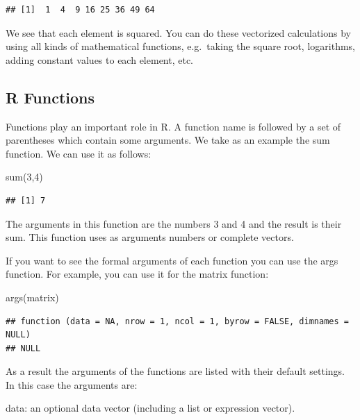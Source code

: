 \documentclass[
]{book}
\newenvironment{Shaded}{\begin{snugshade}}{\end{snugshade}}
\newcommand{\DecValTok}[1]{\textcolor[rgb]{0.00,0.00,0.81}{#1}}
\newcommand{\FunctionTok}[1]{\textcolor[rgb]{0.00,0.00,0.00}{#1}}
\newcommand{\NormalTok}[1]{#1}
\begin{document}
\begin{verbatim}
## [1]  1  4  9 16 25 36 49 64
\end{verbatim}

We see that each element is squared. You can do these vectorized calculations by using all kinds of mathematical functions, e.g.~taking the square root, logarithms, adding constant values to each element, etc.

\hypertarget{r-functions}{%
\subsection{R Functions}\label{r-functions}}

Functions play an important role in R. A function name is followed by a set of parentheses which contain some arguments. We take as an example the sum function. We can use it as follows:

\begin{Shaded}
\begin{Highlighting}[]
\FunctionTok{sum}\NormalTok{(}\DecValTok{3}\NormalTok{,}\DecValTok{4}\NormalTok{)}
\end{Highlighting}
\end{Shaded}

\begin{verbatim}
## [1] 7
\end{verbatim}

The arguments in this function are the numbers 3 and 4 and the result is their sum. This function uses as arguments numbers or complete vectors.

If you want to see the formal arguments of each function you can use the args function. For example, you can use it for the matrix function:

\begin{Shaded}
\begin{Highlighting}[]
\FunctionTok{args}\NormalTok{(matrix)}
\end{Highlighting}
\end{Shaded}

\begin{verbatim}
## function (data = NA, nrow = 1, ncol = 1, byrow = FALSE, dimnames = NULL) 
## NULL
\end{verbatim}

As a result the arguments of the functions are listed with their default settings. In this case the arguments are:

data: an optional data vector (including a list or expression vector).
\end{document}
